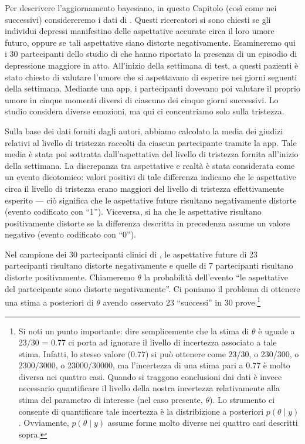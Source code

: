 \documentclass[
  11pt,
]{krantz}
\theoremstyle{definition}
\theoremstyle{definition}
\theoremstyle{definition}
\theoremstyle{definition}
\theoremstyle{remark}
\begin{document}
Per descrivere l'aggiornamento bayesiano, in questo Capitolo (così come nei successivi) considereremo i dati di \citet{zetschefuture2019}. Questi ricercatori si sono chiesti se gli individui depressi manifestino delle aspettative accurate circa il loro umore futuro, oppure se tali aspettative siano distorte negativamente. Esamineremo qui i 30 partecipanti dello studio di \citet{zetschefuture2019} che hanno riportato la presenza di un episodio di depressione maggiore in atto. All'inizio della settimana di test, a questi pazienti è stato chiesto di valutare l'umore che si aspettavano di esperire nei giorni seguenti della settimana. Mediante una app, i partecipanti dovevano poi valutare il proprio umore in cinque momenti diversi di ciascuno dei cinque giorni successivi. Lo studio considera diverse emozioni, ma qui ci concentriamo solo sulla tristezza.

Sulla base dei dati forniti dagli autori, abbiamo calcolato la media dei giudizi relativi al livello di tristezza raccolti da ciascun partecipante tramite la app. Tale media è stata poi sottratta dall'aspettativa del livello di tristezza fornita all'inizio della settimana. La discrepanza tra aspettative e realtà è stata considerata come un evento dicotomico: valori positivi di tale differenza indicano che le aspettative circa il livello di tristezza erano maggiori del livello di tristezza effettivamente esperito --- ciò significa che le aspettative future risultano negativamente distorte (evento codificato con ``1''). Viceversa, si ha che le aspettative risultano positivamente distorte se la differenza descritta in precedenza assume un valore negativo (evento codificato con ``0'').

Nel campione dei 30 partecipanti clinici di \citet{zetschefuture2019}, le aspettative future di 23 partecipanti risultano distorte negativamente e quelle di 7 partecipanti risultano distorte positivamente. Chiameremo \(\theta\) la probabilità dell'evento ``le aspettative del partecipante sono distorte negativamente''. Ci poniamo il problema di ottenere una stima a posteriori di \(\theta\) avendo osservato 23 ``successi'' in 30 prove.\footnote{Si noti un punto importante: dire semplicemente che la stima di \(\theta\) è uguale a 23/30 = 0.77 ci porta ad ignorare il livello di incertezza associato a tale stima. Infatti, lo stesso valore (0.77) si può ottenere come 23/30, o 230/300, o 2300/3000, o 23000/30000, ma l'incertezza di una stima pari a 0.77 è molto diversa nei quattro casi. Quando si traggono conclusioni dai dati è invece necessario quantificare il livello della nostra incertezza relativamente alla stima del parametro di interesse (nel caso presente, \(\theta\)). Lo strumento ci consente di quantificare tale incertezza è la distribizione a posteriori \(p(\theta \mid y)\). Ovviamente, \(p(\theta \mid y)\) assume forme molto diverse nei quattro casi descritti sopra.}
\end{document}
